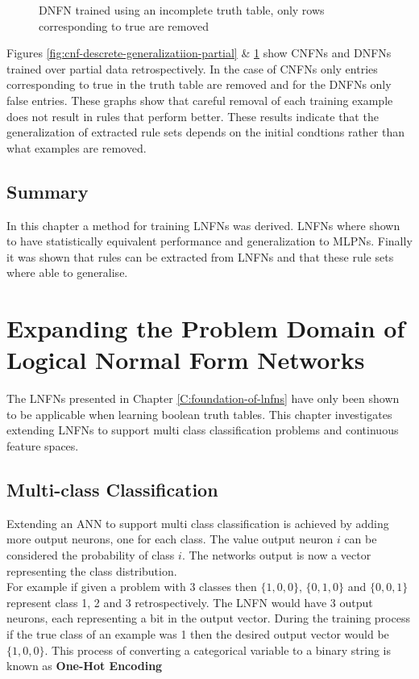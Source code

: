 \begin{figure}[H]
\begin{minipage}[b]{0.45\textwidth}
		\caption{DNFN trained using an incomplete truth table, only rows corresponding to true are removed}
		\label{fig:dnf-descrete-generalizatiion-partial}
	\end{minipage}
	\hfill
\end{figure}

Figures \ref{fig:cnf-descrete-generalizatiion-partial} \& \ref{fig:dnf-descrete-generalizatiion-partial} show CNFNs and DNFNs trained over partial data retrospectively. In the case of CNFNs only entries corresponding to true in the truth table are removed and for the DNFNs only false entries. These graphs show that careful removal of each training example does not result in rules that perform better. These results indicate that the generalization of extracted rule sets depends on the initial condtions rather than what examples are removed.

\section{Summary}
In this chapter a method for training LNFNs was derived. LNFNs where shown to have statistically equivalent performance and generalization to MLPNs. Finally it was shown that rules can be extracted from LNFNs and that these rule sets where able to generalise.

\chapter{Expanding the Problem Domain of Logical Normal Form Networks} \label{C:investigation-of-lnfns}
The LNFNs presented in Chapter \ref{C:foundation-of-lnfns} have only been shown to be applicable when learning boolean truth tables. This chapter investigates extending LNFNs to support multi class classification problems and continuous feature spaces.

\section{Multi-class Classification}
Extending an ANN to support multi class classification is achieved by adding more output neurons, one for each class. The value output neuron $i$ can be considered the probability of class $i$. The networks output is now a vector representing the class distribution. \\

For example if given a problem with 3 classes then $\{1,0,0\}$, $\{0,1,0\}$ and $\{0,0,1\}$ represent class 1, 2 and 3 retrospectively. The LNFN would have 3 output neurons, each representing a bit in the output vector. During the training process if the true class of an example was 1 then the desired output vector would be $\{1,0,0\}$. This process of converting a categorical variable to a binary string is known as \textbf{One-Hot Encoding}

